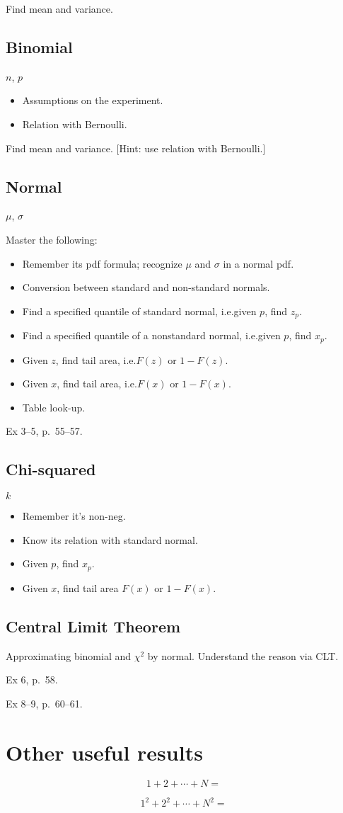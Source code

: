 \documentclass[12pt]{article}
\begin{document}
\example Find mean and variance.

\subsection{Binomial}
$n$, $p$

\begin{itemize}
\item Assumptions on the experiment.
\item Relation with Bernoulli.
\end{itemize}

\example Find mean and variance. [Hint: use relation with Bernoulli.]

\subsection{Normal}
$\mu$, $\sigma$

Master the following:
\begin{itemize}
\item Remember its pdf formula; recognize $\mu$ and $\sigma$ in a normal
pdf.
\item Conversion between standard and non-standard normals.
\item Find a specified quantile of standard normal,
    i.e.\@ given $p$, find $z_p$.
\item Find a specified quantile of a nonstandard normal,
    i.e.\@ given $p$, find $x_p$.
\item Given $z$, find tail area, i.e.\@ $F(z)$ or $1-F(z)$.
\item Given $x$, find tail area, i.e.\@ $F(x)$ or $1-F(x)$.
\item Table look-up.
\end{itemize}

\example
Ex 3--5, p.~55--57.

\subsection{Chi-squared}
$k$

\begin{itemize}
\item Remember it's non-neg.
\item Know its relation with standard normal.
\item Given $p$, find $x_p$.
\item Given $x$, find tail area $F(x)$ or $1 - F(x)$.
\end{itemize}
\subsection{Central Limit Theorem}

Approximating binomial and $\chi^2$ by normal.
Understand the reason via CLT.

\example Ex 6, p.~58.

\example Ex 8--9, p.~60--61.

\section{Other useful results}

\[
1 + 2 + \dotsb + N =
\]

\[
1^2 + 2^2 + \dotsb + N^2 =
\]
\end{document}

